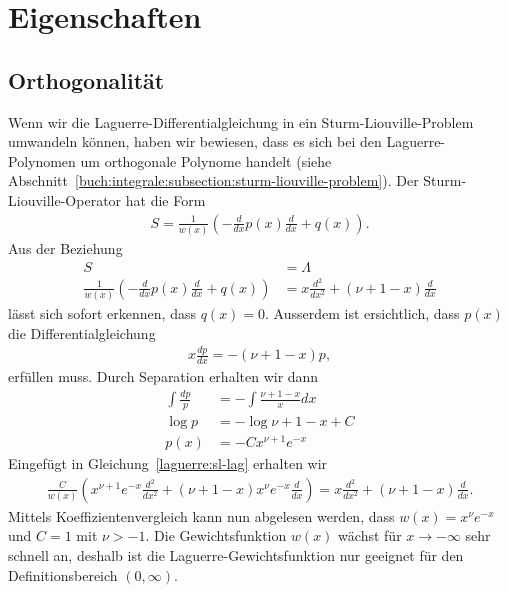 %
%
%
\section{Eigenschaften
  \label{laguerre:section:eigenschaften}}

\subsection{Orthogonalität}
Wenn wir die Laguerre\--Differentialgleichung in ein
Sturm\--Liouville\--Problem umwandeln können, haben wir bewiesen, dass es sich
bei
den Laguerre\--Polynomen um orthogonale Polynome handelt (siehe
Abschnitt~\ref{buch:integrale:subsection:sturm-liouville-problem}).
Der Sturm-Liouville-Operator hat die Form
\begin{align}
S
=
\frac{1}{w(x)} \left(-\frac{d}{dx}p(x) \frac{d}{dx} + q(x) \right).
\label{laguerre:slop}
\end{align}
Aus der Beziehung
\begin{align}
S
 & =
\Lambda
\nonumber
\\
\frac{1}{w(x)} \left(-\frac{d}{dx}p(x) \frac{d}{dx} + q(x) \right)
 & =
x \frac{d^2}{dx^2} + (\nu + 1 - x) \frac{d}{dx}
\label{laguerre:sl-lag}
\end{align}
lässt sich sofort erkennen, dass $q(x) = 0$.
Ausserdem ist ersichtlich, dass $p(x)$ die Differentialgleichung
\begin{align*}
x \frac{dp}{dx}
=
-(\nu + 1 - x) p,
\end{align*}
erfüllen muss.
Durch Separation erhalten wir dann
\begin{align*}
\int \frac{dp}{p}
 & =
-\int \frac{\nu + 1 - x}{x}dx
\\
\log p
 & =
-\log \nu + 1 - x + C
\\
p(x)
 & =
-C x^{\nu + 1} e^{-x}
\end{align*}
Eingefügt in Gleichung~\eqref{laguerre:sl-lag} erhalten wir
\begin{align*}
\frac{C}{w(x)}
\left(
x^{\nu+1} e^{-x} \frac{d^2}{dx^2} +
(\nu + 1 - x) x^{\nu} e^{-x} \frac{d}{dx}
\right)
=
x \frac{d^2}{dx^2} + (\nu + 1 - x) \frac{d}{dx}.
\end{align*}
Mittels Koeffizientenvergleich kann nun abgelesen werden, dass $w(x) = x^\nu
e^{-x}$ und $C=1$ mit $\nu > -1$.
Die Gewichtsfunktion $w(x)$ wächst für $x\rightarrow-\infty$ sehr schnell an,
deshalb ist die Laguerre-Gewichtsfunktion nur geeignet für den
Definitionsbereich $(0, \infty)$.
